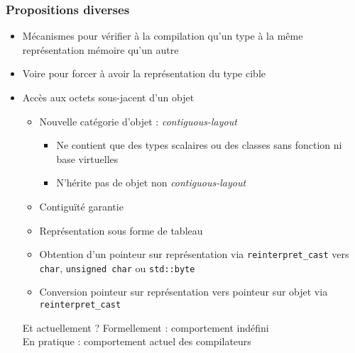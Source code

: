 \documentclass[C++.tex]{subfiles}
\begin{document}
\begin{frame}[fragile]
	\frametitle{Propositions diverses}
	\begin{itemize}
		\item Mécanismes pour vérifier à la compilation qu'un type à la même représentation mémoire  qu'un autre


		\item Voire pour forcer à avoir la représentation du type cible
		\item Accès aux octets sous-jacent d'un objet
		\begin{itemize}
			\item Nouvelle catégorie d'objet : \textit{contiguous-layout}
			\begin{itemize}
				\item Ne contient que des types scalaires ou des classes sans fonction ni base virtuelles
				\item N'hérite pas de objet non \textit{contiguous-layout}
			\end{itemize}
			\item Contiguïté garantie
			\item Représentation sous forme de tableau
			\item Obtention d'un pointeur sur représentation via \lstinline|reinterpret_cast| vers \lstinline|char|, \lstinline|unsigned char| ou \lstinline|std::byte|
			\item Conversion pointeur sur représentation vers pointeur sur objet via \lstinline|reinterpret_cast|
		\end{itemize}

		\begin{block}{Et actuellement ?}
			Formellement : comportement indéfini\\
			En pratique : comportement actuel des compilateurs 
		\end{block}
	\end{itemize}
\end{frame}
\end{document}
